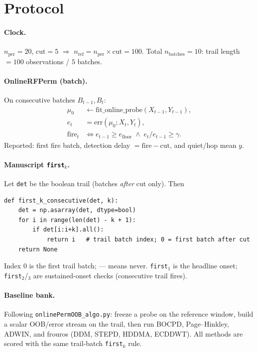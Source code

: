 \documentclass[11pt]{article}
\begin{document}
\section{Protocol}
\paragraph{Clock.}
$n_{\mathrm{per}}=20$, $\mathrm{cut}=5$ $\Rightarrow$
$n_{\mathrm{ref}}=n_{\mathrm{per}}\times\mathrm{cut}=100$.
Total $n_{\mathrm{batches}}=10$: trail length $=100$ observations / $5$ batches.

\paragraph{OnlineRFPerm (batch).}
On consecutive batches $B_{t-1},B_t$:
\begin{align*}
\mu_0 &\leftarrow \mathrm{fit\_online\_probe}(X_{t-1},Y_{t-1}),\\
e_t &= \mathrm{err}(\mu_0; X_t,Y_t),\\
\mathrm{fire}_t &\iff e_{t-1}\ge e_{\mathrm{floor}}
  \;\wedge\; e_t/e_{t-1}\ge \gamma.
\end{align*}
Reported: first fire batch, detection delay $=\mathrm{fire}-\mathrm{cut}$,
and quiet/hop mean $y$.

\paragraph{Manuscript \texttt{first}$_k$.}
Let \texttt{det} be the boolean trail (batches \emph{after} cut only). Then
\begin{verbatim}
def first_k_consecutive(det, k):
    det = np.asarray(det, dtype=bool)
    for i in range(len(det) - k + 1):
        if det[i:i+k].all():
            return i   # trail batch index; 0 = first batch after cut
    return None
\end{verbatim}
Index $0$ is the first trail batch; --- means never.
\texttt{first}$_1$ is the headline onset; \texttt{first}$_2$/$_3$ are
sustained-onset checks (consecutive trail fires).

\paragraph{Baseline bank.}
Following \texttt{onlinePermOOB\_algo.py}: freeze a probe on the reference
window, build a scalar OOB/error stream on the trail, then run BOCPD,
Page--Hinkley, ADWIN, and frouros (DDM, STEPD, HDDMA, ECDDWT). All methods are
scored with the same trail-batch \texttt{first}$_k$ rule.
\end{document}
